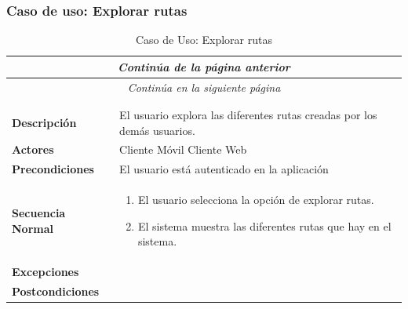 \newpage
\subsubsection*{Caso de uso: Explorar rutas}
\begin{longtable}{| p{4cm} | p{10cm} |}
\endfirsthead
\multicolumn{2}{c}{\textit{Continúa de la página anterior}}\\[12pt]
\hline
\endhead
\hline
\multicolumn{2}{c}{\textit{Continúa en la siguiente página}} \\
\endfoot
\hline
\caption{Caso de Uso: Explorar rutas}\label{fig:1}\\
\endlastfoot


\hline
\multicolumn{2}{|c|}{\textbf{CU$<$04$>$ - Explorar Rutas}} \\

\hline
\textbf{Descripción} &
El usuario explora las diferentes rutas creadas por los demás usuarios.\\

\hline
\textbf{Actores} &
Cliente Móvil\newline
Cliente Web\\

\hline
\textbf{Precondiciones} &
El usuario está autenticado en la aplicación\\

\hline
\textbf{Secuencia Normal} &\mbox{}\par\vspace{-\baselineskip}
\begin{enumerate}[leftmargin=0.7cm, topsep=0.1cm]
\item El usuario selecciona la opción de explorar rutas.
\item El sistema muestra las diferentes rutas que hay en el sistema.
\end{enumerate}\\

\hline
\textbf{Excepciones} &\mbox{}\par\vspace{-\baselineskip}
\\

\hline
\textbf{Postcondiciones} & 
\\
\hline
\end{longtable}



\newpage
